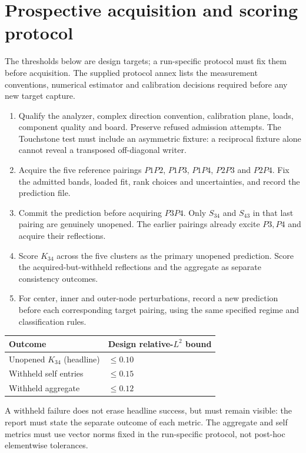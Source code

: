 \documentclass[11pt]{article}
\begin{document}
\section{Prospective acquisition and scoring protocol}
The thresholds below are design targets; a run-specific protocol must fix
them before acquisition. The supplied protocol annex lists the measurement
conventions, numerical estimator and calibration decisions required before
any new target capture.

\begin{enumerate}
\item Qualify the analyzer, complex direction convention, calibration plane,
loads, component quality and board. Preserve refused admission attempts.
The Touchstone test must include an asymmetric fixture: a reciprocal
fixture alone cannot reveal a transposed off-diagonal writer.
\item Acquire the five reference pairings $P1P2$, $P1P3$, $P1P4$, $P2P3$
and $P2P4$. Fix the admitted bands, loaded fit, rank choices and
uncertainties, and record the prediction file.
\item Commit the prediction before acquiring $P3P4$.
Only $S_{34}$ and $S_{43}$ in that last pairing are genuinely unopened.
The earlier pairings already excite $P3,P4$ and acquire their reflections.
\item Score $K_{34}$ across the five clusters as the primary unopened
prediction. Score the acquired-but-withheld reflections and the aggregate
as separate consistency outcomes.
\item For center, inner and outer-node perturbations, record a new prediction
before each corresponding target pairing, using the same specified regime
and classification rules.
\end{enumerate}

\begin{center}
\begin{tabular}{p{.57\linewidth}p{.28\linewidth}}
\toprule
Outcome & Design relative-$L^2$ bound\\
\midrule
Unopened $K_{34}$ (headline) & $\leq0.10$\\
Withheld self entries & $\leq0.15$\\
Withheld aggregate & $\leq0.12$\\
\bottomrule
\end{tabular}
\end{center}
A withheld failure does not erase headline success, but must remain visible:
the report must state the separate outcome of each metric.
The aggregate and self metrics must use vector norms fixed in the
run-specific protocol, not post-hoc elementwise tolerances.
\end{document}
